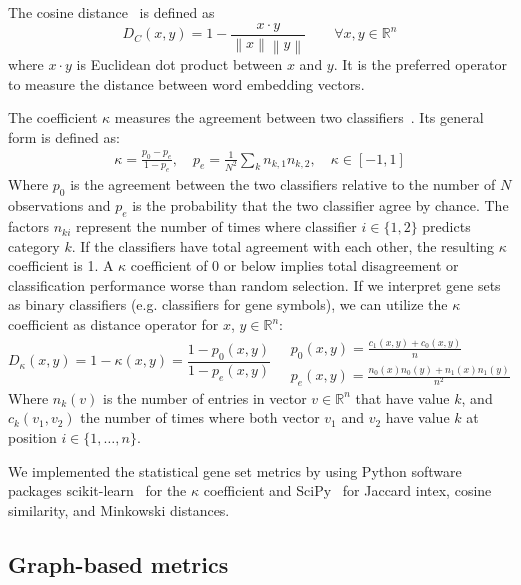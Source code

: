 \documentclass{thesisclass}
\begin{document}
The cosine distance~\cite{Vijaymeena} is defined as
\begin{equation} \label{eq:cosine_dist}
	D_C(x,y)= 1- \frac{x \cdot y}{\left\| x \right\| \left\| y \right\|} \qquad \forall x, y \in \mathbb{R}^n
\end{equation}
where $x \cdot y$ is Euclidean dot product between $x$ and $y$. It is the preferred operator to measure the distance between word embedding vectors.

The coefficient $\kappa$ measures the agreement between two classifiers~\cite{Artstein:2008:IAC:1479202.1479206}. Its general form is defined as:
\begin{align*} \label{eq:kappa}
	\kappa = \frac{p_0-p_e}{1-p_e}, \quad p_e = \frac{1}{N^2} \sum_{k} n_{k,1} n_{k,2}, \quad \kappa \in [-1, 1]
\end{align*}
Where $p_0$ is the agreement between the two classifiers relative to the number of $N$ observations and $p_e$ is the probability that the two classifier agree by chance. The factors $n_{ki}$ represent the number of times where classifier $i \in \lbrace 1,2 \rbrace$ predicts category $k$.
If the classifiers have total agreement with each other, the resulting $\kappa$ coefficient is 1.
A $\kappa$ coefficient of 0 or below implies total disagreement or classification performance worse than random selection.
If we interpret gene sets as binary classifiers (e.g. classifiers for gene symbols), we can utilize the $\kappa$ coefficient as distance operator for $x$, $y \in \mathbb{R}^n$:
\begin{equation} \label{eq:kappa_dist}
	D_\kappa(x, y)= 1-\kappa(x, y) = \frac{1-p_0(x,y)}{1-p_e(x,y)} \quad 
	\begin{array}{l}
		\displaystyle p_0(x,y) = \frac{c_1(x,y)+ c_0(x,y)}{n} \\
		\displaystyle p_e(x,y) = \frac{n_0(x)n_0(y)+ n_1(x)n_1(y)}{n^2}	
	\end{array}
\end{equation}
Where $n_k(v)$ is the number of entries in vector $v \in \mathbb{R}^n$ that have value $k$, and $c_k(v_1,v_2)$ the number of times where both vector $v_1$ and $v_2$ have value $k$ at position $i \in \lbrace 1, \ldots, n\rbrace$.

We implemented the statistical gene set metrics by using Python software packages scikit-learn~\cite{scikit-learn} for the $\kappa$ coefficient and SciPy~\cite{scipy} for Jaccard intex, cosine similarity, and Minkowski distances.

\subsection{Graph-based metrics}
\end{document}
